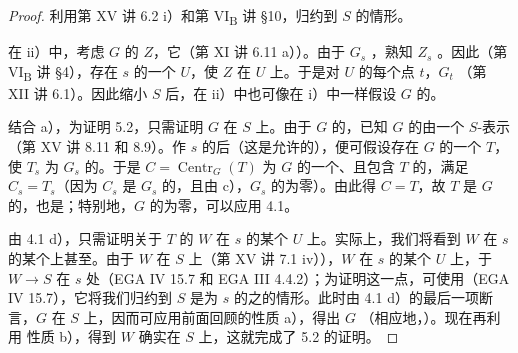 \begin{proof}
利用第 XV 讲 6.2 i）和第 VI\textsubscript{B} 讲 §10，归约到 $S$ 的情形。

在 ii）中，考虑 $G$ 的 $Z$，它（第 XI 讲 6.11 a））。由于 $G_s$ ，熟知 $Z_s$ 。因此（第 VI\textsubscript{B} 讲 §4），存在 $s$ 的一个 $U$，使 $Z$ 在 $U$ 上。于是对 $U$ 的每个点 $t$，$G_t$ （第 XII 讲 6.1）。因此缩小 $S$ 后，在 ii）中也可像在 i）中一样假设 $G$ 的。

结合 a），为证明 5.2，只需证明 $G$ 在 $S$ 上。由于 $G$ 的，已知 $G$ 的由一个 $S$-表示（第 XV 讲 8.11 和 8.9）。作 $s$ 的后（这是允许的），便可假设存在 $G$ 的一个 $T$，使 $T_s$ 为 $G_s$ 的。于是 $C=\operatorname{Centr}_G(T)$ 为 $G$ 的一个、且包含 $T$ 的，满足 $C_s=T_s$（因为 $C_s$ 是 $G_s$ 的，且由 c），$G_s$ 的为零）。由此得 $C=T$，故 $T$ 是 $G$ 的，也是；特别地，$G$ 的为零，可以应用 4.1。

由 4.1 d），只需证明关于 $T$ 的 $W$ 在 $s$ 的某个 $U$ 上。实际上，我们将看到 $W$ 在 $s$ 的某个上甚至。由于 $W$ 在 $S$ 上（第 XV 讲 7.1 iv）），$W$ 在 $s$ 的某个 $U$ 上，于 $W\to S$ 在 $s$ 处（EGA IV 15.7 和 EGA III 4.4.2）；为证明这一点，可使用（EGA IV 15.7），它将我们归约到 $S$ 是为 $s$ 的之的情形。此时由 4.1 d）的最后一项断言，$G$ 在 $S$ 上，因而可应用前面回顾的性质 a），得出 $G$ （相应地，）。现在再利用
性质 b），得到 $W$ 确实在 $S$ 上，这就完成了 5.2 的证明。
\end{proof}

